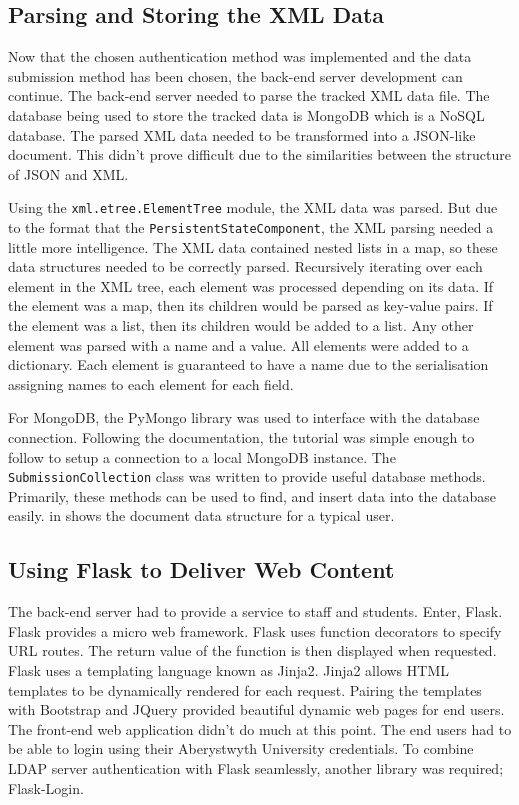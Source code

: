 \subsection{Parsing and Storing the XML Data}
Now that the chosen authentication method was implemented and the data submission method has been chosen, the back-end server development can continue. The back-end server needed to parse the tracked XML data file. The database being used to store the tracked data is MongoDB which is a NoSQL database. The parsed XML data needed to be transformed into a JSON-like document. This didn't prove difficult due to the similarities between the structure of JSON and XML.

Using the \texttt{xml.etree.ElementTree} module, the XML data was parsed. But due to the format that the \texttt{PersistentStateComponent}, the XML parsing needed a little more intelligence. The XML data contained nested lists in a map, so these data structures needed to be correctly parsed. Recursively iterating over each element in the XML tree, each element was processed depending on its data. If the element was a map, then its children would be parsed as key-value pairs. If the element was a list, then its children would be added to a list. Any other element was parsed with a name and a value. All elements were added to a dictionary. Each element is guaranteed to have a name due to the serialisation assigning names to each element for each field.

For MongoDB, the PyMongo library was used to interface with the database connection\cite{PyMongoDocs}. Following the documentation, the tutorial was simple enough to follow to setup a connection to a local MongoDB instance. The \texttt{SubmissionCollection} class was written to provide useful database methods. Primarily, these methods can be used to find, and insert data into the database easily.  in  shows the document data structure for a typical user.

\subsection{Using Flask to Deliver Web Content}
The back-end server had to provide a service to staff and students. Enter, Flask. Flask provides a micro web framework. Flask uses function decorators to specify URL routes. The return value of the function is then displayed when requested. Flask uses a templating language known as Jinja2. Jinja2 allows HTML templates to be dynamically rendered for each request. Pairing the templates with Bootstrap and JQuery provided beautiful dynamic web pages for end users. The front-end web application didn't do much at this point. The end users had to be able to login using their Aberystwyth University credentials. To combine LDAP server authentication with Flask seamlessly, another library was required; Flask-Login.

